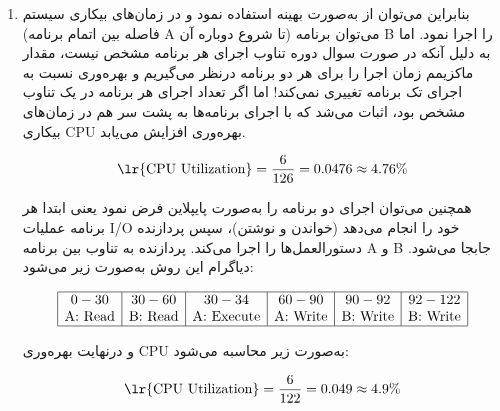 \begin{qsolve}
\begin{enumerate}
		
	\end{enumerate}
\end{qsolve}


\begin{qsolve}
	\begin{enumerate}
		\item [ ]
		بنابراین می‌توان از  به‌صورت بهینه استفاده نمود و در زمان‌های بیکاری سیستم (فاصله بین اتمام برنامه A تا شروع دوباره آن) می‌توان برنامه B را اجرا نمود. اما به دلیل آنکه در صورت سوال دوره تناوب اجرای هر برنامه مشخص نیست، مقدار ماکزیمم زمان اجرا را برای هر دو برنامه درنظر می‌گیریم و بهره‌وری نسبت به اجرای تک برنامه تغییری نمی‌کند! اما اگر تعداد اجرای هر برنامه در یک تناوب مشخص بود، اثبات می‌شد که با اجرای برنامه‌ها به پشت سر هم در زمان‌های بیکاری CPU بهره‌وری افزایش می‌یابد.
		
		$$ \text{\lr{CPU Utilization}} = \frac{6}{126}=0.0476\approx 4.76 \% $$
		
		
		
		همچنین می‌توان اجرای دو برنامه را به‌صورت پایپلاین فرض نمود یعنی ابتدا هر برنامه عملیات I/O خود را انجام می‌دهد (خواندن و نوشتن)، سپس پردازنده دستورالعمل‌ها را اجرا می‌کند. پردازنده به تناوب بین برنامه A و B جابجا می‌شود. دیاگرام این روش به‌صورت زیر می‌شود:
		
		\[
		\begin{array}{|c|c|c|c|c|c|}
			\hline
			0-30 & 30-60 & 30-34 & 60-90 & 90-92 & 92-122 \\
			\text{A: Read} & \text{B: Read} & \text{A: Execute} & \text{A: Write} & \text{B: \text{Write}} & \text{B: Write} \\
			\hline
		\end{array}
		\]
		
		و درنهایت بهره‌وری CPU به‌صورت زیر محاسبه می‌شود:
		
		$$ \text{\lr{CPU Utilization}} = \frac{6}{122}=0.049\approx 4.9 \% $$
		
		
		
	\end{enumerate}
\end{qsolve}